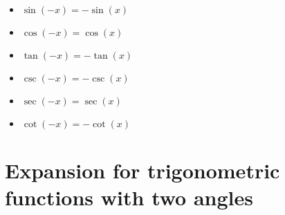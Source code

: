 \documentclass{article}
\begin{document}
\begin{itemize}
	\item $\sin(-x) = -\sin(x)$
	\item $\cos(-x) = \cos(x)$
	\item $\tan(-x) = -\tan(x)$
	\item $\csc(-x) = -\csc(x)$
	\item $\sec(-x) = \sec(x)$
	\item $\cot(-x) = -\cot(x)$
\end{itemize}

\maketitle
\section{Expansion for trigonometric functions with two angles}
\end{document}
